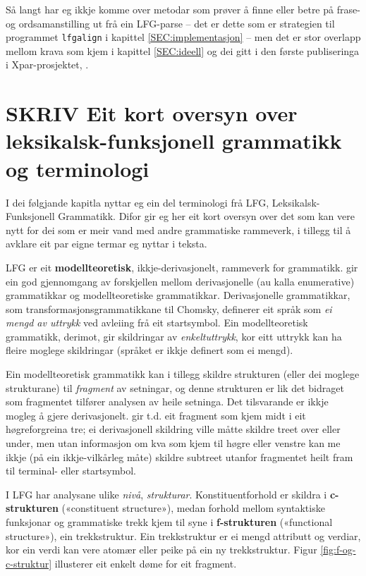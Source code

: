 \documentclass[11pt,a4paper,oneside,draft]{book}
\begin{document}
Så langt har eg ikkje komme over metodar som prøver å finne eller
betre på frase- og ordsamanstilling ut frå ein LFG-parse -- det er
dette som er strategien til programmet \texttt{lfgalign} i kapittel
\ref{SEC:implementasjon} -- men det er stor overlapp mellom krava som
kjem i kapittel \ref{SEC:ideell} og dei gitt i den første publiseringa
i Xpar-prosjektet, \citet{dyvik2009lmp}.

\section{\textbf{SKRIV} Eit kort oversyn over leksikalsk-funksjonell grammatikk og terminologi}
\label{sec-2.2}

 \label{SEC:omgrepsavklaring}

 I dei følgjande kapitla nyttar eg ein del terminologi frå LFG,
 Leksikalsk-Funksjonell Grammatikk. Difor gir eg her eit kort oversyn
 over det som kan vere nytt for dei som er meir vand med andre
 grammatiske rammeverk, i tillegg til å avklare eit par eigne termar
 eg nyttar i teksta.

 LFG er eit \textbf{modellteoretisk}, ikkje-derivasjonelt, rammeverk for
 grammatikk.  \citet{pullum2001dbm} gir ein god gjennomgang av
 forskjellen mellom derivasjonelle (au kalla enumerative) grammatikkar
 og modellteoretiske grammatikkar. Derivasjonelle grammatikkar, som
 transformasjonsgrammatikkane til Chomsky, definerer eit språk som \emph{ei  mengd av uttrykk} ved avleiing frå eit startsymbol. Ein
 modellteoretisk grammatikk, derimot, gir skildringar av
 \emph{enkeltuttrykk}, kor eitt uttrykk kan ha fleire moglege skildringar
 (språket er ikkje definert som ei mengd).

 Ein modellteoretisk grammatikk kan i tillegg skildre strukturen
 (eller dei moglege strukturane) til \emph{fragment} av setningar, og denne
 strukturen er lik det bidraget som fragmentet tilfører analysen av
 heile setninga. Det tilsvarande er ikkje mogleg å gjere
 derivasjonelt. \citet[s.~32--33]{pullum2001dbm} gir t.d. eit fragment
 som kjem midt i eit høgreforgreina tre; ei derivasjonell skildring
 ville måtte skildre treet over eller under, men utan informasjon om
 kva som kjem til høgre eller venstre kan me ikkje (på ein
 ikkje-vilkårleg måte) skildre subtreet utanfor fragmentet heilt fram
 til terminal- eller startsymbol.

 I LFG har analysane ulike \emph{nivå}, \emph{strukturar}. Konstituentforhold er
 skildra i \textbf{c-strukturen} («constituent structure»), medan forhold
 mellom syntaktiske funksjonar og grammatiske trekk kjem til syne i
 \textbf{f-strukturen} («functional structure»), ein trekkstruktur. Ein
 trekkstruktur er ei mengd attributt og verdiar, kor ein verdi kan
 vere atomær eller peike på ein ny trekkstruktur.  Figur
 \ref{fig:f-og-c-struktur} illusterer eit enkelt døme for eit
 fragment.
\end{document}
